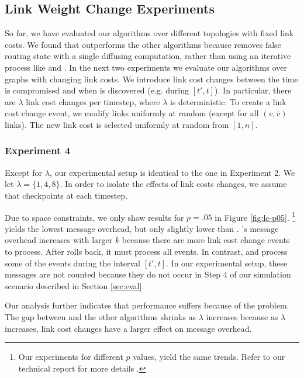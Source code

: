 \subsection{Link Weight Change Experiments}
\label{subsec:change}

So far, we have evaluated our algorithms over different topologies with fixed link costs. We found that \cpr outperforms the other algorithms because \cpr removes false
routing state with a single diffusing computation, rather than using an iterative process like \second and \purges.  In the next 
two experiments we evaluate our algorithms over graphs with changing link costs. We introduce link cost changes between the time \bad is compromised and when \bad is discovered 
(e.g. during $[t',t]$). 
In particular, there are $\lambda$ link cost changes per timestep, where $\lambda$ is deterministic. 
To create a link cost change event, we modify links uniformly at random (except for all $(v,\bar{v})$ links). %
The new link cost is selected uniformly at random from $[1,n]$. 

\subsubsection{Experiment 4}

Except for $\lambda$, our experimental setup is identical to the one in Experiment 2. We let $\lambda = \{1,4,8\}$. In order to isolate the effects of link costs changes,
we assume that \cpr checkpoints at each timestep.

Due to space constraints, we only show results for $p=.05$ in Figure \ref{fig:lc-p05}.  
{\footnote {\small Our experiments for different $p$ values, yield the same trends.  Refer to our technical report for more details \cite{Tech}.}}
\purge yields the lowest message overhead, but only slightly lower than \cprs. 
\cprs's message overhead increases with larger $k$ because there are more link cost change events to process. After \cpr rolls back, it must process all \lcd events. 
In contrast, \second and \purge process some of the \lcd events during the interval $[t',t]$.  In our experimental setup, these messages are not counted because 
they do not occur in Step 4 of our simulation scenario described in Section \ref{sec:eval}.

Our analysis further indicates that \second performance suffers because of the \infinity problem. %
The gap between \second and the other algorithms shrinks as $\lambda$ increases because as $\lambda$ increases, link cost changes have a larger effect on message overhead.



